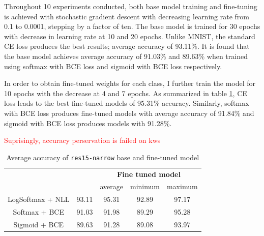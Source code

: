 \documentclass{article}
\newcommand{\red}[1]{\textcolor{red}{#1}}
\begin{document}
Throughout 10 experiments conducted, both base model training and fine-tuning is achieved with stochastic gradient descent with decreasing learning rate from 0.1 to 0.0001, stepping by a factor of ten. The base model is trained for 30 epochs with decrease in learning rate at 10 and 20 epochs. Unlike MNIST, the standard CE loss produces the best results; average accuracy of 93.11\%. It is found that the base model achieves average accuracy of 91.03\% and 89.63\% when trained using softmax with BCE loss and sigmoid with BCE loss respectively.

In order to obtain fine-tuned weights for each class, I further train the model for 10 epochs with the decrease at 4 and 7 epochs. As summarized in table \ref{table:kws}, CE loss leads to the best fine-tuned models of 95.31\% accuracy. Similarly, softmax with BCE loss produces fine-tuned models with average accuracy of 91.84\% and sigmoid with BCE loss produces models with 91.28\%.



\red{Suprisingly, accuracy perservation is failed on kws}

\begin{table}[t]
    \centering
    \begin{tabular}{ccccc}
        \toprule[1pt]
        \multirow{2}{*}{\raisebox{-3\heavyrulewidth}{\bf Loss function}} &
        \multirow{2}{*}{\raisebox{-3\heavyrulewidth}{\bf Base model}} &
        \multicolumn{3}{c}{\bf Fine tuned model } \\
        \cmidrule(lr){3-5}
        & & average & minimum & maximum \\
        \midrule
        LogSoftmax + NLL & 93.11 & 95.31 & 92.89 & 97.17 \\
        Softmax + BCE & 91.03 & 91.98 & 89.29 & 95.28 \\
        Sigmoid + BCE & 89.63 & 91.28 & 89.08 & 93.97 \\
        \bottomrule[1pt]
    \end{tabular}
    \caption{Average accuracy of \texttt{res15-narrow} base and fine-tuned model}
    \label{table:kws}
\end{table}
\end{document}

